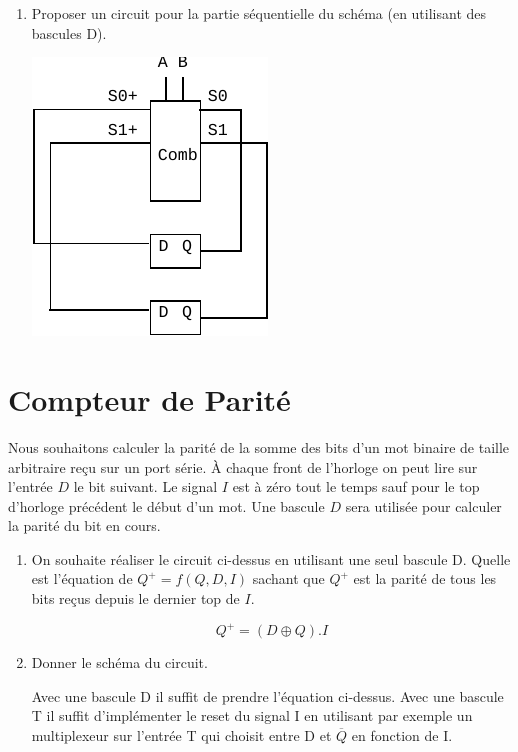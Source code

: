 \documentclass[a4paper,10pt]{exam}
\begin{document}
\begin{enumerate}
  \item Proposer un circuit pour la partie séquentielle du schéma (en utilisant
    des bascules D).
    \begin{solution}
      \includegraphics{TD9-auto2}
    \end{solution}

\end{enumerate}

\section{Compteur de Parité}
Nous souhaitons calculer la parité de la somme des bits d'un mot binaire de
taille arbitraire reçu sur un port série. À chaque front de l'horloge on peut
lire sur l'entrée $D$ le bit suivant. Le signal $I$ est à zéro tout le temps
sauf pour le top d'horloge précédent le début d'un mot. Une bascule $D$ sera
utilisée pour calculer la parité du bit en cours.

\begin{enumerate}
  \item On souhaite réaliser le circuit ci-dessus en utilisant une seul bascule
    D. Quelle est l'équation de $Q^{+} = f(Q,D,I)$ sachant que $Q^{+}$ est la
    parité de tous les bits reçus depuis le dernier top de $I$.

    \begin{solution}
      $$Q^+ = (D \oplus Q).I $$
    \end{solution}
  \item Donner le schéma du circuit.
    \begin{solution}
      Avec une bascule D il suffit de prendre l'équation ci-dessus.
      Avec une bascule T il suffit d'implémenter le reset du signal I en
      utilisant par exemple un multiplexeur sur l'entrée T qui choisit entre
      D et $\overline{Q}$ en fonction de I.
    \end{solution}
\end{enumerate}
\end{document}
